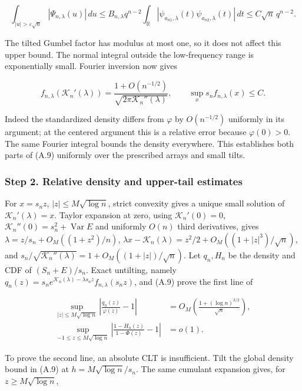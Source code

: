 \documentclass{article}
\begin{document}
\[
\int_{|u|>\varepsilon\sqrt n}|\Psi_{n,\lambda}(u)|\,du
\le B_{n,\lambda}q^{n-2}
\int_{\mathbb R}|\psi_{a_{n1},\lambda}(t)\psi_{a_{n2},\lambda}(t)|\,dt
\le C\sqrt n\,q^{n-2}.
\]

The tilted Gumbel factor has modulus at most one, so it does not affect
this upper bound. The normal integral outside the low-frequency range is
exponentially small. Fourier inversion now gives

\[
f_{n,\lambda}(\mathcal K_n'(\lambda))
=\frac{1+O(n^{-1/2})}{\sqrt{2\pi\mathcal K_n''(\lambda)}},
\qquad
\sup_x s_nf_{n,\lambda}(x)\le C .
\tag{A.9}
\]

Indeed the standardized density differs from \(\varphi\) by
\(O(n^{-1/2})\) uniformly in its argument; at the centered argument this
is a relative error because \(\varphi(0)>0\). The same Fourier integral
bounds the density everywhere. This establishes both parts of (A.9)
uniformly over the prescribed arrays and small tilts.

\subsubsection*{Step 2. Relative density and upper-tail
estimates}\label{step-2.-relative-density-and-upper-tail-estimates}

For \(x=s_nz\), \(|z|\le M\sqrt{\log n}\), strict convexity gives a
unique small solution of \(\mathcal K_n'(\lambda)=x\). Taylor expansion
at zero, using \(\mathcal K_n'(0)=0\),
\(\mathcal K_n''(0)=s_n^2+\operatorname{Var}E\) and uniformly \(O(n)\)
third derivatives, gives \(\lambda=z/s_n+O_M((1+z^2)/n)\),
\(\lambda x-\mathcal K_n(\lambda)=z^2/2+O_M((1+|z|^3)/\sqrt n)\), and
\(s_n/\sqrt{\mathcal K_n''(\lambda)}=1+O_M((1+|z|)/\sqrt n)\). Let
\(q_n,H_n\) be the density and CDF of \((S_n+E)/s_n\). Exact untilting,
namely
\(q_n(z)=s_ne^{\mathcal K_n(\lambda)-\lambda s_nz}f_{n,\lambda}(s_nz)\),
and (A.9) prove the first line of

\[
\begin{aligned}
\sup_{|z|\le M\sqrt{\log n}}\left|\frac{q_n(z)}{\varphi(z)}-1\right|
&=O_M\!\left(\frac{1+(\log n)^{3/2}}{\sqrt n}\right),\\
\sup_{-1\le z\le M\sqrt{\log n}}
\left|\frac{1-H_n(z)}{1-\Phi(z)}-1\right|&=o(1).
\end{aligned}
\tag{A.10}
\]

To prove the second line, an absolute CLT is insufficient. Tilt the
global density bound in (A.9) at \(h=M\sqrt{\log n}/s_n\). The same
cumulant expansion gives, for \(z\ge M\sqrt{\log n}\),
\end{document}
